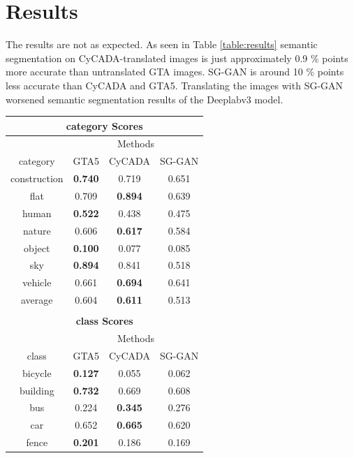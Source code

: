 \section{Results}
The results are not as expected. As seen in Table \ref{table:results} semantic segmentation on CyCADA-translated images is just approximately 0.9 \% points more accurate than untranslated GTA images. SG-GAN is around 10 \% points less accurate than CyCADA and GTA5. Translating the images with SG-GAN worsened semantic segmentation results of the Deeplabv3 model. 
\begin{table}
	\centering
	\begin{tabular}{|c|c|c|c|}
		\multicolumn{4}{c}{\textbf{category Scores}}\\
		\hline
		\multicolumn{1}{c}{} & \multicolumn{3}{c}{Methods}\\
		\cline{2-4}
		\multicolumn{1}{c|}{category} & GTA5 & CyCADA & SG-GAN \\ 
		\hline
		construction & \textbf{0.740} & 0.719 & 0.651 \\ 
		\hline 
		flat & 0.709 & \textbf{0.894} & 0.639 \\ 
		\hline 
		human & \textbf{0.522} & 0.438 & 0.475 \\ 
		\hline 
		nature & 0.606 & \textbf{0.617} & 0.584 \\ 
		\hline 
		object & \textbf{0.100} & 0.077 & 0.085 \\ 
		\hline 
		sky & \textbf{0.894} & 0.841 & 0.518 \\ 
		\hline 
		vehicle & 0.661 & \textbf{0.694} & 0.641 \\ 
		\hline \hline
		average & 0.604 & \textbf{0.611} & 0.513\\
		\hline
		\multicolumn{4}{c}{}\\
		\multicolumn{4}{c}{\textbf{class Scores}}\\
		\hline
		\multicolumn{1}{c}{} & \multicolumn{3}{c}{Methods}\\
		\cline{2-4}
		\multicolumn{1}{c|}{class} & GTA5 & CyCADA & SG-GAN \\ 
		\hline
		bicycle & \textbf{0.127} & 0.055 & 0.062 \\ 
		\hline 
		building & \textbf{0.732} & 0.669 & 0.608 \\ 
		\hline 
		bus & 0.224 & \textbf{0.345} & 0.276 \\ 
		\hline 
		car & 0.652 & \textbf{0.665} & 0.620 \\ 
		\hline 
		fence & \textbf{0.201} & 0.186 & 0.169 \\ 

\end{tabular}
\end{table}
